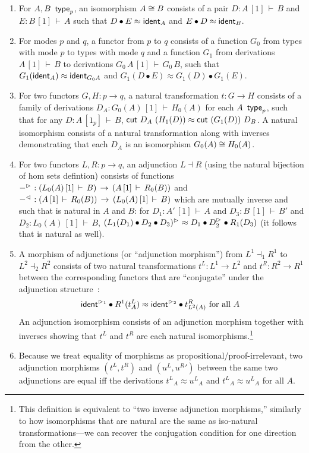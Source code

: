 \documentclass{drl-common/llncs}
\newcommand{\la}{\ensuremath{\dashv}}
\renewcommand\wftp[2]{\ensuremath{#1 \,\,\, \dsd{type}_{#2}}}
\newcommand\seq[3]{\ensuremath{#1 \, [ #2 ] \, \vdash \, #3}}
\newcommand\ident[1]{\ensuremath{\dsd{ident}_{#1}}}
\newcommand\cutsym{\ensuremath{\dsd{cut}}}
\newcommand\cut[2]{\ensuremath{{\cutsym \,\, #1 \,\, #2}}}
\newcommand\cuti{\ensuremath{\bullet}}
\newcommand\ap[2]{\ensuremath{#1 \approx #2}}
\begin{document}
\begin{enumerate}
\item For $\wftp{A,B}{p}$, an isomorphism $A \cong B$ consists of a pair $D :
\seq{A}{1}{B}$ and $E : \seq{B}{1}{A}$ such that
$\ap{{D} \cuti {E}}{\ident{A}}$ and $\ap{{E} \cuti {D}}{\ident{B}}$.

\item For modes $p$ and $q$, a functor from $p$ to $q$ consists of 
a function $G_0$ from types with mode $p$ to types with mode $q$ 
and a function $G_1$ from derivations \seq{A}{1}{B} to 
derivations \seq{G_0 \, A}{1}{G_0 \, B}, such that
$\ap {G_1(\ident{A})}  {\ident{G_0 A}}$
and
$\ap {G_1(D \cuti E)}  {G_1(D) \cuti G_1(E)}$.

\item For two functors $G,H : p \to q$, a natural transformation $t : G
  \to H$ consists of a family of derivations $D_A :
  \seq{G_0(A)}{1}{H_0(A)}$ for each \wftp{A}{p}, such that for any $D :
  \seq{A}{1_p}{B}$, \ap{\cut{D_A}{(H_1(D))}}{\cut{(G_1(D))}{D_B}}.  A
  natural isomorphism consists of a natural transformation along with
  inverses demonstrating that each $D_A$ is an isomorphism $G_0(A) \cong
  H_0(A)$.  

\item For two functors $L,R : p \to q$, an adjunction $L \la R$ (using
  the natural bijection of hom sets defintion) consists of functions
  $\ltor{-}{} : (\seq{L_0(A)}{1}{B}) \, \to \, (\seq{A}{1}{R_0(B)})$ and
  $\rtol{-}{} : (\seq{A}{1}{R_0(B)}) \, \to \, (\seq{L_0(A)}{1}{B})$ which are
  mutually inverse and such that \ltor{-}{} is natural in $A$ and $B$: for
  $D_1 : \seq{A'}{1}{A}$ and $D_3 : \seq{B}{1}{B'}$ and $D_2 :
  \seq{L_0(A)}{1}{B}$, \ap{\ltor{(L_1(D_1) \cuti D_2 \cuti D_3)}{}}{D_1
    \cuti \ltor{D_2}{} \cuti {R_1(D_3)}} (it follows that \rtol{-}{} is
  natural as well).  

\item A morphism of adjunctions (or ``adjunction morphism'') from $L^1
  \la_1 R^1$ to $L^2 \la_2 R^2$ consists of two natural transformations
  $t^L : L^1 \to L^2$ and $t^R : R^2 \to R^1$ between the corresponding
  functors that are ``conjugate'' under the adjunction
  structure~\citep{maclane}:
  \[
  \ap {\ltor{\ident{}}{1} \cuti {R^1(t^L_{A})}} { \ltor{\ident{}}{2} \cuti t^R_{L^2(A)} } \text{ for all $A$ }
  \]
  An adjunction isomorphism consists of an adjunction morphism together
  with inverses showing that $t^L$ and $t^R$ are each natural
  isomorphisms.\footnote{This definition is equivalent to ``two inverse
    adjunction morphisms,'' similarly to how isomorphisms that are
    natural are the same as iso-natural transformations---we can recover
    the conjugation condition for one direction from the other.}

\item Because we treat equality of morphisms as
  propositional/proof-irrelevant, two adjunction morphisms $(t^L,t^R)$
  and $({u^L},{u^R}')$ between the same two adjunctions are equal iff
  the derivations $\ap{{t^L}_A}{{u^L}_A}$ and $\ap{{t^L}_A}{{u^L}_A}$
  for all $A$.
\end{enumerate}
\end{document}
